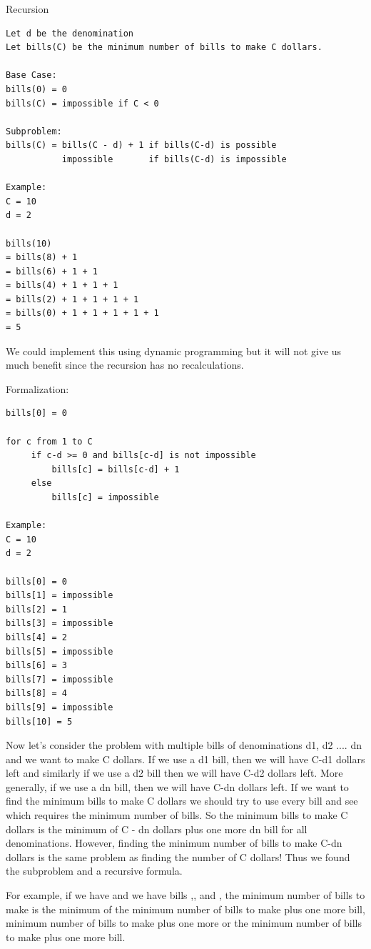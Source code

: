 \documentclass[11pt,oneside]{book}
\begin{document}
Recursion

\begin{lstlisting}
Let d be the denomination
Let bills(C) be the minimum number of bills to make C dollars.

Base Case:
bills(0) = 0
bills(C) = impossible if C < 0

Subproblem:
bills(C) = bills(C - d) + 1 if bills(C-d) is possible
           impossible       if bills(C-d) is impossible

Example:
C = 10
d = 2

bills(10) 
= bills(8) + 1
= bills(6) + 1 + 1
= bills(4) + 1 + 1 + 1
= bills(2) + 1 + 1 + 1 + 1
= bills(0) + 1 + 1 + 1 + 1 + 1
= 5
\end{lstlisting}

We could implement this using dynamic programming but it will not give us much benefit since the recursion has no recalculations.

Formalization:

\begin{lstlisting}
bills[0] = 0

for c from 1 to C
     if c-d >= 0 and bills[c-d] is not impossible
         bills[c] = bills[c-d] + 1
     else
         bills[c] = impossible

Example:
C = 10
d = 2

bills[0] = 0
bills[1] = impossible
bills[2] = 1
bills[3] = impossible
bills[4] = 2
bills[5] = impossible
bills[6] = 3
bills[7] = impossible
bills[8] = 4
bills[9] = impossible
bills[10] = 5
\end{lstlisting}

Now let's consider the problem with multiple bills of denominations d1, d2 .... dn and we want to make C dollars. If we use a d1 bill, then we will have C-d1 dollars left and similarly if we use a d2 bill then we will have C-d2 dollars left. More generally, if we use a dn bill, then we will have C-dn dollars left. If we want to find the minimum bills to make C dollars we should try to use every bill and see which requires the minimum number of bills. So the minimum bills to make C dollars is the minimum of C - dn dollars plus one more dn bill for all denominations. However, finding the minimum number of bills to make C-dn dollars is the same problem as finding the number of C dollars! Thus we found the subproblem and a recursive formula.

For example, if we have  and we have bills ,, and , the minimum number of bills to make  is the minimum of the minimum number of bills to make  plus one more  bill, minimum number of bills to make  plus one more  or the minimum number of bills to make  plus one more  bill.
\end{document}
